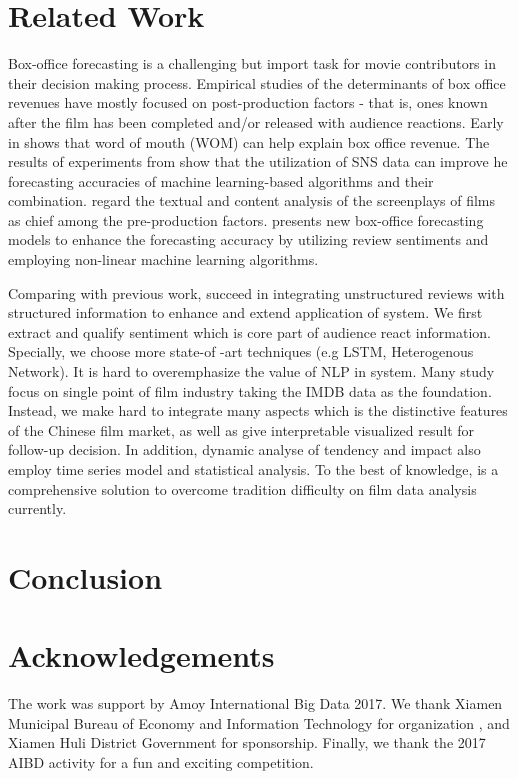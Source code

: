 \section{Related Work}
\label{sec:related}
\par Box-office forecasting is a challenging but import task for movie contributors in their decision making process. Empirical studies of the determinants of box office revenues have mostly focused on post-production factors - that is, ones known after the film has been completed and/or released with audience reactions. Early in \cite{liu2006word} shows that word of mouth (WOM) can help explain box office revenue. The results of experiments from \cite{kim2015box} show that the utilization of SNS data can improve he forecasting accuracies of machine learning-based algorithms and their combination. \cite{hunter2016predicting} regard the textual and content analysis of the screenplays of films as chief among the pre-production factors. \cite{hur2016box} presents new box-office forecasting models to enhance the forecasting accuracy by utilizing review sentiments and employing non-linear machine learning algorithms.

\par Comparing with previous work, \system succeed in integrating unstructured reviews with structured information to enhance and extend application of system. We first extract and qualify sentiment which is core part of audience react information. Specially, we choose more state-of -art techniques (e.g LSTM\cite{katiyar2016investigating}, Heterogenous Network\cite{sun2012when}). It is hard to overemphasize the value of NLP in system. Many study \cite{kim2015box,hur2016box,tang2015target-dependent} focus on single point of film industry taking the IMDB data as the foundation. Instead, we make hard to integrate many aspects which is the distinctive features of the Chinese film market, as well as give interpretable visualized result for follow-up decision. In addition, dynamic analyse of tendency and impact also employ time series model and statistical analysis. To the best of knowledge, \system is a comprehensive solution to overcome tradition difficulty on film data analysis currently.

\section{Conclusion}
\label{sec:conclu}

\section{Acknowledgements}
The work was support by Amoy International Big Data 2017. We thank Xiamen Municipal Bureau of Economy and Information Technology for organization , and Xiamen Huli District Government for sponsorship. Finally, we thank the 2017 AIBD activity for a fun and exciting competition. 